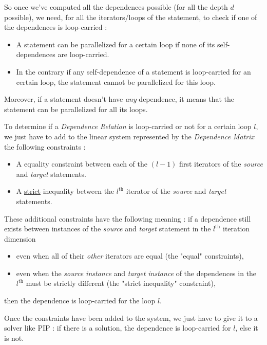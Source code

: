 \documentclass[paper=a4, fontsize=11.5pt]{scrartcl}
\numberwithin{equation}{section}        %
\numberwithin{figure}{section}          %
\numberwithin{table}{section}               %
\begin{document}
        So once we've computed all the dependences possible (for all the depth $d$ possible),
        we need, for all the iterators/loops of the statement, to check if one of the dependences
        is loop-carried :
        \begin{itemize}
            \item A statement can be parallelized for a certain loop if none of its \glspl{self-dependence}
                are loop-carried.
            \item In the contrary if any \gls{self-dependence} of a statement is loop-carried for an certain loop,
                the statement cannot be parallelized for this loop.
        \end{itemize}
        Moreover, if a statement doesn't have \textit{any} dependence, it means that the
        statement can be parallelized for all its loops.

        \bigskip

        To determine if a \textit{Dependence Relation} is loop-carried or not for a certain
        loop $l$, we just have to add to the linear system represented by the
        \textit{Dependence Matrix} the following constraints :
        \begin{itemize}
            \item A equality constraint between each of the $(l-1)$ first iterators
                of the \textit{source} and \textit{target} statements.
            \item A \underline{strict} inequality between the $l^{\text{th}}$ iterator of
                the \textit{source} and \textit{target} statements.
        \end{itemize}
        These additional constraints have the following meaning : if a dependence
        still exists between instances of the \textit{source} and \textit{target}
        statement in the $l^\text{th}$ iteration dimension
        \begin{itemize}
            \item even when all of their \textit{other} iterators are equal (the "equal" constraints),
            \item even when the \textit{source instance} and \textit{target instance} of the dependences
                in the $l^\text{th}$ must be strictly different (the "strict inequality" constraint),
        \end{itemize}
        then the dependence is loop-carried for the loop $l$.

        Once the constraints have been added to the system, we just have to give it to a
        solver like PIP : if there is a solution, the dependence is loop-carried for $l$,
        else it is not.
        
\end{document}
